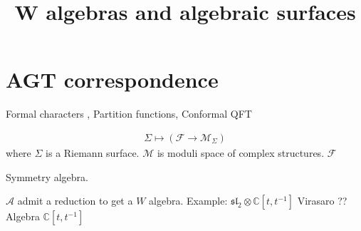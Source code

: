 % 



\title{W algebras and algebraic surfaces}
\author{}
\date{}

 
\maketitle

\section{AGT correspondence} %

Formal characters , Partition functions, Conformal QFT

\begin{align}
    \Sigma \mapsto ( \mathcal{F} \rightarrow \mathcal{M}_\Sigma) 
\end{align}
where $\Sigma $ is a Riemann surface. 
$\mathcal{M} $ is moduli space of complex structures. 
$ \mathcal{F} $ 

Symmetry algebra. 

$\mathcal{A} $ admit a reduction to get a $W$ algebra. 
Example: 
$\mathfrak{sl}_2 \otimes \mathbb{C} [t, t^{-1} ] $ 
Virasaro ?? Algebra $ \mathbb{C} [t, t^{-1} ] $ 










 


